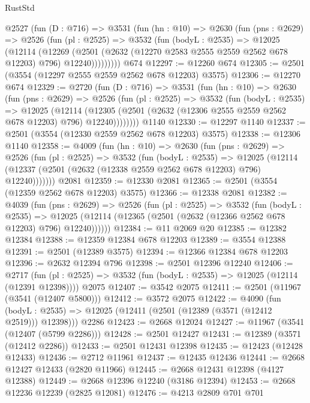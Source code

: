 \begin{lexlean}{RustStd}
\begin{coremodule}
{\begin{coremodule}
{{{{{{{{{{{{{{{{{{{{    @2527
      (fun (D : @716) =>
      @3531
        (fun (hn : @10) =>
        @2630
          (fun (pns : @2629) =>
          @2526
            (fun (pl : @2525) =>
            @3532
              (fun (bodyL : @2535) =>
              @12025
                (@12114
                  (@12269
                    (@2501 (@2632 (@12270 @2583 @2555 @2559 @2562 @678 @12203) @796) @12240)))))))))
    @674
@12297 := @12260 @674
@12305 := @2501 (@3554 (@12297 @2555 @2559 @2562 @678 @12203) @3575)
@12306 := @12270 @674
@12329 := @2720
    (fun (D : @716) =>
    @3531
      (fun (hn : @10) =>
      @2630
        (fun (pns : @2629) =>
        @2526
          (fun (pl : @2525) =>
          @3532
            (fun (bodyL : @2535) =>
            @12025
              (@12114
                (@12305 (@2501 (@2632 (@12306 @2555 @2559 @2562 @678 @12203) @796) @12240))))))))
    @1140
@12330 := @12297 @1140
@12337 := @2501 (@3554 (@12330 @2559 @2562 @678 @12203) @3575)
@12338 := @12306 @1140
@12358 := @4009
    (fun (hn : @10) =>
    @2630
      (fun (pns : @2629) =>
      @2526
        (fun (pl : @2525) =>
        @3532
          (fun (bodyL : @2535) =>
          @12025 (@12114 (@12337 (@2501 (@2632 (@12338 @2559 @2562 @678 @12203) @796) @12240)))))))
    @2081
@12359 := @12330 @2081
@12365 := @2501 (@3554 (@12359 @2562 @678 @12203) @3575)
@12366 := @12338 @2081
@12382 := @4039
    (fun (pns : @2629) =>
    @2526
      (fun (pl : @2525) =>
      @3532
        (fun (bodyL : @2535) =>
        @12025 (@12114 (@12365 (@2501 (@2632 (@12366 @2562 @678 @12203) @796) @12240))))))
@12384 := @11 @2069 @20
@12385 := @12382 @12384
@12388 := @12359 @12384 @678 @12203
@12389 := @3554 @12388
@12391 := @2501 (@12389 @3575)
@12394 := @12366 @12384 @678 @12203
@12396 := @2632 @12394 @796
@12398 := @2501 @12396 @12240
@12406 := @2717
    (fun (pl : @2525) => @3532 (fun (bodyL : @2535) => @12025 (@12114 (@12391 @12398))))
    @2075
@12407 := @3542 @2075
@12411 := @2501 (@11967 (@3541 (@12407 @5800)))
@12412 := @3572 @2075
@12422 := @4090
    (fun (bodyL : @2535) => @12025 (@12411 (@2501 (@12389 (@3571 (@12412 @2519))) @12398)))
    @2286
@12423 := @2668 @12024
@12427 := @11967 (@3541 (@12407 (@5799 @2286)))
@12428 := @2501 @12427
@12431 := @12389 (@3571 (@12412 @2286))
@12433 := @2501 @12431 @12398
@12435 := @12423 (@12428 @12433)
@12436 := @2712 @11961
@12437 := @12435 @12436
@12441 := @2668 @12427 @12433 (@2820 @11966)
@12445 := @2668 @12431 @12398 (@4127 @12388)
@12449 := @2668 @12396 @12240 (@3186 @12394)
@12453 := @2668 @12236 @12239 (@2825 @12081)
@12476 := @4213
    @2809
    @701
    @701
}}}}}}}}}}}}}}}}}}}}
\end{coremodule}}
\end{coremodule}
\end{lexlean}
